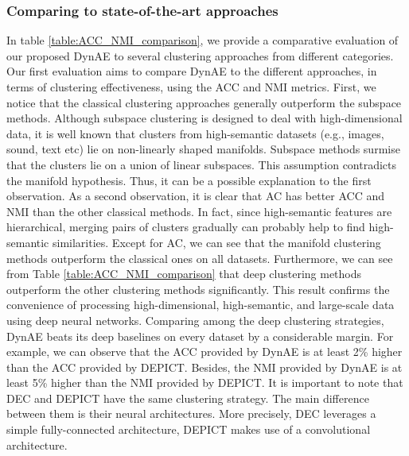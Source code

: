 \documentclass{article}
\begin{document}
\subsubsection{Comparing to state-of-the-art approaches}
In table \ref{table:ACC_NMI_comparison}, we provide a comparative evaluation of our proposed DynAE to several clustering approaches from different categories. Our first evaluation aims to compare DynAE to the different approaches, in terms of clustering effectiveness, using the ACC and NMI metrics. First, we notice that the classical clustering approaches generally outperform the subspace methods. Although subspace clustering is designed to deal with high-dimensional data, it is well known that clusters from high-semantic datasets (e.g., images, sound, text etc) lie on non-linearly shaped manifolds. Subspace methods surmise that the clusters lie on a union of linear subspaces. This assumption contradicts the manifold hypothesis. Thus, it can be a possible explanation to the first observation. As a second observation, it is clear that AC has better ACC and NMI than the other classical methods. In fact, since high-semantic features are hierarchical, merging pairs of clusters gradually can probably help to find high-semantic similarities. Except for AC, we can see that the manifold clustering methods outperform the classical ones on all datasets. Furthermore, we can see from Table \ref{table:ACC_NMI_comparison} that deep clustering methods outperform the other clustering methods significantly. This result confirms the convenience of processing high-dimensional, high-semantic, and large-scale data using deep neural networks. Comparing among the deep clustering strategies, DynAE beats its deep baselines on every dataset by a considerable margin. For example, we can observe that the ACC provided by DynAE is at least 2\% higher than the ACC provided by DEPICT. Besides, the NMI provided by DynAE is at least 5\% higher than the NMI provided by DEPICT. It is important to note that DEC and DEPICT have the same clustering strategy. The main difference between them is their neural architectures. More precisely,  DEC leverages a simple fully-connected architecture, DEPICT makes use of a convolutional architecture.
                                                            
\end{document}

